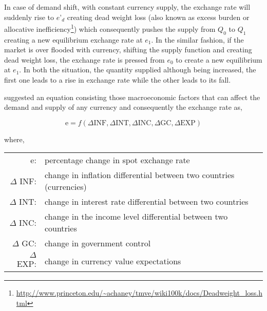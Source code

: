 \documentclass[12pt, lot, lof]{thesis}\usepackage[]{graphicx}\usepackage[]{color}
\begin{document}
In case of demand shift, with constant currency supply, the exchange rate will suddenly rise to $e’_d$ creating dead weight loss (also known as excess burden or allocative inefficiency\footnote{\url{http://www.princeton.edu/~achaney/tmve/wiki100k/docs/Deadweight_loss.html}}) which consequently pushes the supply from $Q_0$ to $Q_1$ creating a new equilibrium exchange rate at $e_1$. In the similar fashion, if the market is over flooded with currency, shifting the supply function and creating dead weight loss, the exchange rate is pressed from $e_0$ to create a new equilibrium at $e_1$. In both the situation, the quantity supplied although being increased, the first one leads to a rise in exchange rate while the other leads to its fall.

\citet*[p.~103]{madura2012international} suggested an equation consisting those macroeconomic factors that can affect the demand and supply of any currency and consequently the exchange rate as,

\begin{equation}
\text{e} = f \left(\Delta \text{INF}, \Delta \text{INT}, \Delta \text{INC}, \Delta \text{GC}, \Delta \text{EXP}\right)
\end{equation}

where,
\begin{tabularx}{\textwidth}{rl}
e: & percentage change in spot exchange rate\\
$\Delta$ INF: & change in inflation differential between two countries (currencies)\\
$\Delta$ INT: & change in interest rate differential between two countries\\
$\Delta$ INC: & change in the income level differential between two countries\\
$\Delta$ GC: &  change in government control\\
$\Delta$ EXP: & change in currency value expectations\\
\end{tabularx}
\end{document}
